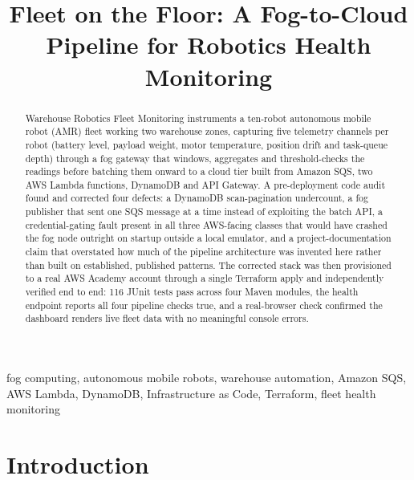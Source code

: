 \documentclass[conference]{IEEEtran}
\begin{document}
\title{Fleet on the Floor: A Fog-to-Cloud Pipeline for Robotics Health Monitoring}

\author{
}

\maketitle
{}

\begin{abstract}
Warehouse Robotics Fleet Monitoring instruments a ten-robot autonomous mobile robot (AMR) fleet working two warehouse zones, capturing five telemetry channels per robot (battery level, payload weight, motor temperature, position drift and task-queue depth) through a fog gateway that windows, aggregates and threshold-checks the readings before batching them onward to a cloud tier built from Amazon SQS, two AWS Lambda functions, DynamoDB and API Gateway. A pre-deployment code audit found and corrected four defects: a DynamoDB scan-pagination undercount, a fog publisher that sent one SQS message at a time instead of exploiting the batch API, a credential-gating fault present in all three AWS-facing classes that would have crashed the fog node outright on startup outside a local emulator, and a project-documentation claim that overstated how much of the pipeline architecture was invented here rather than built on established, published patterns. The corrected stack was then provisioned to a real AWS Academy account through a single Terraform apply and independently verified end to end: 116 JUnit tests pass across four Maven modules, the health endpoint reports all four pipeline checks true, and a real-browser check confirmed the dashboard renders live fleet data with no meaningful console errors.
\end{abstract}

\begin{IEEEkeywords}
fog computing, autonomous mobile robots, warehouse automation, Amazon SQS, AWS Lambda, DynamoDB, Infrastructure as Code, Terraform, fleet health monitoring
\end{IEEEkeywords}


\section{Introduction}
\end{document}
